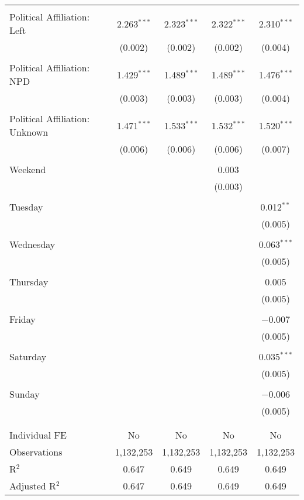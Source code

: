 \documentclass[
]{article}
\begin{document}
\begin{table}[!htbp]
{\begin{tabular}{@{\extracolsep{5pt}}lcccc}
  & & & & \\ 
 Political Affiliation: Left & 2.263$^{***}$ & 2.323$^{***}$ & 2.322$^{***}$ & 2.310$^{***}$ \\ 
  & (0.002) & (0.002) & (0.002) & (0.004) \\ 
  & & & & \\ 
 Political Affiliation: NPD & 1.429$^{***}$ & 1.489$^{***}$ & 1.489$^{***}$ & 1.476$^{***}$ \\ 
  & (0.003) & (0.003) & (0.003) & (0.004) \\ 
  & & & & \\ 
 Political Affiliation: Unknown & 1.471$^{***}$ & 1.533$^{***}$ & 1.532$^{***}$ & 1.520$^{***}$ \\ 
  & (0.006) & (0.006) & (0.006) & (0.007) \\ 
  & & & & \\ 
 Weekend &  &  & 0.003 &  \\ 
  &  &  & (0.003) &  \\ 
  & & & & \\ 
 Tuesday &  &  &  & 0.012$^{**}$ \\ 
  &  &  &  & (0.005) \\ 
  & & & & \\ 
 Wednesday &  &  &  & 0.063$^{***}$ \\ 
  &  &  &  & (0.005) \\ 
  & & & & \\ 
 Thursday &  &  &  & 0.005 \\ 
  &  &  &  & (0.005) \\ 
  & & & & \\ 
 Friday &  &  &  & $-$0.007 \\ 
  &  &  &  & (0.005) \\ 
  & & & & \\ 
 Saturday &  &  &  & 0.035$^{***}$ \\ 
  &  &  &  & (0.005) \\ 
  & & & & \\ 
 Sunday &  &  &  & $-$0.006 \\ 
  &  &  &  & (0.005) \\ 
  & & & & \\ 
\hline \\[-1.8ex] 
Individual FE & No & No & No & No \\ 
Observations & 1,132,253 & 1,132,253 & 1,132,253 & 1,132,253 \\ 
R$^{2}$ & 0.647 & 0.649 & 0.649 & 0.649 \\ 
Adjusted R$^{2}$ & 0.647 & 0.649 & 0.649 & 0.649 \\ 

\end{tabular}}
\end{table}
\end{document}
